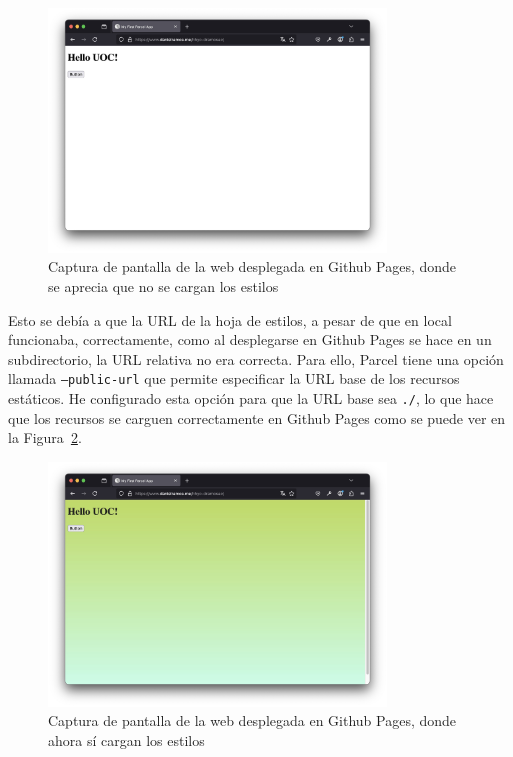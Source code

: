 \documentclass{article}
\begin{document}
\begin{figure}[h!]
    \centering
    \includegraphics[width=0.8\textwidth]{./img/p1/web-semi-deployed}
    \caption{Captura de pantalla de la web desplegada en Github Pages, donde se aprecia que no se cargan los estilos}
    \label{fig:web-semi-deployed}
\end{figure}

Esto se debía a que la URL de la hoja de estilos, a pesar de que en local funcionaba, correctamente, como al desplegarse en Github Pages se hace en un subdirectorio, la URL relativa no era correcta. Para ello, Parcel tiene una opción llamada \texttt{--public-url} que permite especificar la URL base de los recursos estáticos. He configurado esta opción para que la URL base sea \texttt{./}, lo que hace que los recursos se carguen correctamente en Github Pages como se puede ver en la Figura~\ref{fig:web-deployed}.

\begin{figure}[h!]
    \centering
    \includegraphics[width=0.8\textwidth]{./img/p1/web-deployed}
    \caption{Captura de pantalla de la web desplegada en Github Pages, donde ahora sí cargan los estilos}
    \label{fig:web-deployed}
\end{figure}
\end{document}
